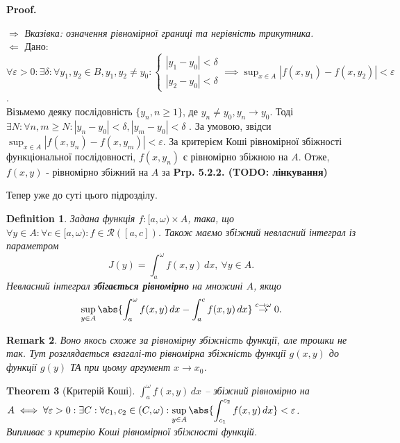 \documentclass[a4paper, 10pt]{article}
\makeatletter
\def\huge{\displaystyle}
\def\rightproof{$\boxed{\Rightarrow}$ }
\def\leftproof{$\boxed{\Leftarrow}$ }
\theoremstyle{theoremdd}
\newtheorem{theorem}{Theorem}[subsection]
\theoremstyle{theoremdd}
\theoremstyle{theoremdd}
\newtheorem{definition}[theorem]{Definition}
\theoremstyle{theoremdd}
\theoremstyle{theoremdd}
\theoremstyle{theoremdd}
\theoremstyle{theoremdd}
\newtheorem{remark}[theorem]{Remark}
\theoremstyle{theoremdd}
\theoremstyle{theoremdd}
\renewenvironment{proof}[1][Proof.\\]{\par
\pushQED{\hfill \qed}%
\normalfont \topsep6\p@\@plus6\p@\relax
\trivlist
\item\relax
{\bfseries
#1\@addpunct{.}}\hspace\labelsep\ignorespaces
}{%
\popQED\endtrivlist\@endpefalse
}
\makeatother
\begin{document}
\begin{proof}
\rightproof \textit{Вказівка: означення рівномірної границі та нерівність трикутника.}
\bigskip \\
\leftproof Дано: $\forall \varepsilon > 0: \exists \delta: \forall y_1,y_2 \in B, y_1,y_2 \neq y_0: \begin{cases} |y_1-y_0| < \delta \\ |y_2-y_0| < \delta \end{cases} \implies \huge\sup_{x \in A} |f(x,y_1)-f(x,y_2)| < \varepsilon$.\\
Візьмемо деяку послідовність $\{y_n, n \geq 1\}$, де $y_n \neq y_0, y_n \to y_0$. Тоді \\ $\exists N: \forall n,m \geq N: |y_n-y_0| < \delta, |y_m - y_0| < \delta$ . За умовою, звідси $\huge\sup_{x \in A} |f(x,y_n) - f(x,y_m)| < \varepsilon$. За критерієм Коші рівномірної збіжності функціональної послідовності, $f(x,y_n)$ є рівномірно збіжною на $A$. Отже, $f(x,y)$ - рівномірно збіжний на $A$ за \textbf{Prp. 5.2.2. (TODO: лінкування)}
\end{proof}

Тепер уже до суті цього підрозділу.

\begin{definition}
Задана функція $f \colon [a,\omega) \times A$, така, що $\forall y \in A: \forall c \in [a,\omega): f\in \mathcal{R}([a,c])$. Також маємо збіжний невласний інтеграл із параметром
\[
J(y)= \int_a^\omega f(x,y)\,dx,\ \forall y \in A.
\]
Невласний інтеграл \textbf{збігається рівномірно} на множині $A$, якщо
\begin{align*}
\sup_{y \in A} \abs{\int_a^\omega f(x,y)\,dx - \int_a^c f(x,y)\,dx} \overset{c \to \omega}{\to} 0.
\end{align*}
\end{definition}

\begin{remark}
Воно якось схоже за рівномірну збіжність функції, але трошки не так. Тут розглядається взагалі-то рівномірна збіжність функції $g(x,y)$ до функції $g(y)$ ТА при цьому аргумент $x \to x_0$.
\end{remark}

\begin{theorem}[Критерій Коші]
$\huge \int_a^\omega f(x,y)\,dx$ -- збіжний рівномірно на $A \iff \forall \varepsilon > 0: \exists C: \forall c_1,c_2 \in (C,\omega): \huge \sup_{y \in A} \abs{\int_{c_1}^{c_2} f(x,y)\,dx} < \varepsilon$.\\
\textit{Випливає з критерію Коші рівномірної збіжності функцій.}
\end{theorem}
\end{document}
